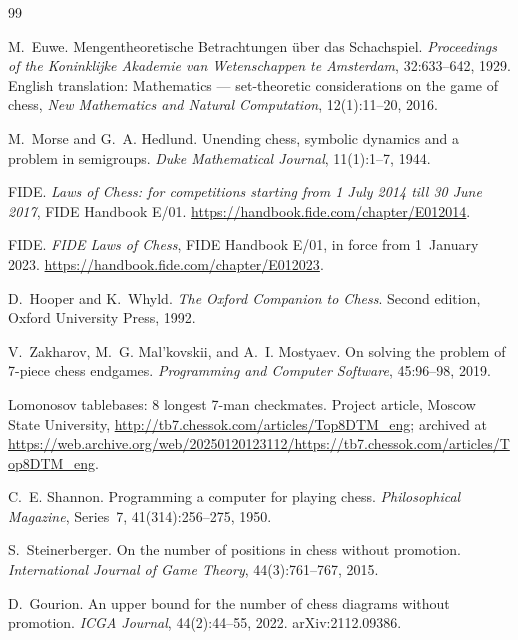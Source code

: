 \documentclass[11pt]{article}
\theoremstyle{definition}
\theoremstyle{remark}
\theoremstyle{plain}
\begin{document}
\begin{thebibliography}{99}

M.~Euwe.
\newblock Mengentheoretische Betrachtungen \"uber das Schachspiel.
\newblock \emph{Proceedings of the Koninklijke Akademie van Wetenschappen
  te Amsterdam}, 32:633--642, 1929.
\newblock English translation: Mathematics --- set-theoretic
  considerations on the game of chess, \emph{New Mathematics and Natural
  Computation}, 12(1):11--20, 2016.

M.~Morse and G.~A. Hedlund.
\newblock Unending chess, symbolic dynamics and a problem in semigroups.
\newblock \emph{Duke Mathematical Journal}, 11(1):1--7, 1944.

FIDE.
\newblock \emph{Laws of Chess: for competitions starting from 1 July 2014
  till 30 June 2017}, FIDE Handbook E/01.
\newblock \url{https://handbook.fide.com/chapter/E012014}.

FIDE.
\newblock \emph{FIDE Laws of Chess}, FIDE Handbook E/01, in force from
  1~January 2023.
\newblock \url{https://handbook.fide.com/chapter/E012023}.

D.~Hooper and K.~Whyld.
\newblock \emph{The Oxford Companion to Chess}.
\newblock Second edition, Oxford University Press, 1992.

V.~Zakharov, M.~G. Mal'kovskii, and A.~I. Mostyaev.
\newblock On solving the problem of 7-piece chess endgames.
\newblock \emph{Programming and Computer Software}, 45:96--98, 2019.

Lomonosov tablebases: 8 longest 7-man checkmates.
\newblock Project article, Moscow State University,
  \url{http://tb7.chessok.com/articles/Top8DTM_eng}; archived at
  \url{https://web.archive.org/web/20250120123112/https://tb7.chessok.com/articles/Top8DTM_eng}.

C.~E. Shannon.
\newblock Programming a computer for playing chess.
\newblock \emph{Philosophical Magazine}, Series~7, 41(314):256--275,
  1950.

S.~Steinerberger.
\newblock On the number of positions in chess without promotion.
\newblock \emph{International Journal of Game Theory}, 44(3):761--767,
  2015.

D.~Gourion.
\newblock An upper bound for the number of chess diagrams without
  promotion.
\newblock \emph{ICGA Journal}, 44(2):44--55, 2022. arXiv:2112.09386.


\end{thebibliography}
\end{document}
